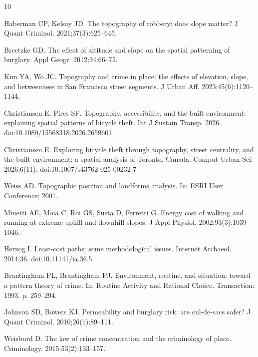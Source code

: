 \documentclass[11pt,letterpaper]{article}
\begin{document}
\begin{thebibliography}{10}

Haberman CP, Kelsay JD.
\newblock The topography of robbery: does slope matter?
\newblock J Quant Criminol. 2021;37(3):625--645.

Breetzke GD.
\newblock The effect of altitude and slope on the spatial patterning of burglary.
\newblock Appl Geogr. 2012;34:66--75.

Kim YA, Wo JC.
\newblock Topography and crime in place: the effects of elevation, slope, and
betweenness in San Francisco street segments.
\newblock J Urban Aff. 2023;45(6):1120--1144.

Christiansen E, Pires SF.
\newblock Topography, accessibility, and the built environment: explaining spatial
patterns of bicycle theft.
\newblock Int J Sustain Transp. 2026.
\newblock doi:10.1080/15568318.2026.2659601

Christiansen E.
\newblock Exploring bicycle theft through topography, street centrality, and the
built environment: a spatial analysis of Toronto, Canada.
\newblock Comput Urban Sci. 2026;6(11).
\newblock doi:10.1007/s43762-025-00232-7

Weiss AD.
\newblock Topographic position and landforms analysis.
\newblock In: ESRI User Conference; 2001.

Minetti AE, Moia C, Roi GS, Susta D, Ferretti G.
\newblock Energy cost of walking and running at extreme uphill and downhill slopes.
\newblock J Appl Physiol. 2002;93(3):1039--1046.

Herzog I.
\newblock Least-cost paths: some methodological issues.
\newblock Internet Archaeol. 2014;36.
\newblock doi:10.11141/ia.36.5

Brantingham PL, Brantingham PJ.
\newblock Environment, routine, and situation: toward a pattern theory of crime.
\newblock In: Routine Activity and Rational Choice. Transaction; 1993. p. 259--294.

Johnson SD, Bowers KJ.
\newblock Permeability and burglary risk: are cul-de-sacs safer?
\newblock J Quant Criminol. 2010;26(1):89--111.

Weisburd D.
\newblock The law of crime concentration and the criminology of place.
\newblock Criminology. 2015;53(2):133--157.


\end{thebibliography}
\end{document}
